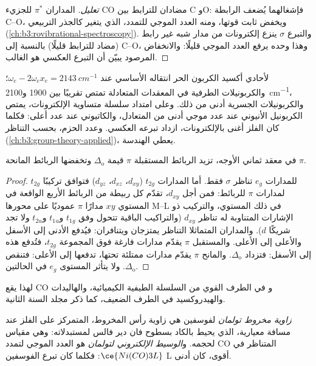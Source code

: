 \begin{proof}[تعليل]
المداران $\pi^*$ للجزيء CO مضادان للترابط بين C وO: فإشغالهما يُضعف
الرابطة C--O، ويخفض ثابت قوتها، ومنه العدد الموجي للتمدد، الذي
يتغير كالجذر التربيعي  (\cref{ch:b3:rovibrational-spectroscopy}).
والتبرع $\sigma$ ينزع إلكترونات من مدار شبه غير رابط (مضاد للترابط قليلًا)
بالنسبة إلى C--O، وهذا وحده يرفع العدد الموجي قليلًا: 
والانخفاض المرصود يبيّن أن التبرع العكسي هو الغالب.
\end{proof}

لأحادي أكسيد الكربون الحر انتقاله الأساسي عند $\omega_e - 2\omega_ex_e = \qty{2143}{cm^{-1}}$؛ 
والكربونيلات الطرفية في المعقدات المتعادلة تمتص تقريبًا بين 1900 و\qty{2100}{cm^{-1}}،
والكربونيلات الجسرية أدنى من ذلك. وعلى امتداد سلسلة متساوية الإلكترونات، يمتص الكربونيل
الأنيوني عند عدد موجي أدنى من المتعادل، والكاتيوني عند
عدد أعلى: فكلما كان الفلز أغنى بالإلكترونات، ازداد تبرعه العكسي. وعدد
الحزم، بحسب التناظر (\cref{ch:b3:group-theory-applied})، يعطي الهندسة.

\begin{proposition}\label{prop:b3:organometallic-bonding:pi-delta}
في معقد ثماني الأوجه، تزيد الربائط المستقبلة $\pi$ قيمة $\Delta_{\mathrm o}$ وتخفضها الربائط
المانحة $\pi$.
\end{proposition}

\begin{proof}
للمدارات $e_g$ تناظر $\sigma$ فقط. أما المدارات $t_{2g}$ ($d_{xy}$، $d_{xz}$، $d_{yz}$) فتوافق تركيبًا $t_{2g}$
لمدارات $\pi$ للربائط: فمن أجل $d_{xy}$، تقدّم كل ربيطة من الربائط الأربع الواقعة في المستوي $xy$
مدارًا $\pi$ عموديًا على محورها M--L في ذلك المستوي، 
والتركيب ذو الإشارات المتناوبة له تناظر $d_{xy}$ (والتراكيب
الباقية تتحول وفق $t_{1g}$ و$t_{1u}$ و$t_{2u}$ ولا تجد شريكًا $d$). والمداران
المتماثلا التناظر يمتزجان ويتنافران: فيُدفع الأدنى إلى الأسفل والأعلى إلى الأعلى. 
والمستقبل $\pi$ يقدّم مدارات فارغة فوق المجموعة $t_{2g}$، فتُدفع هذه إلى الأسفل: فتزداد $\Delta_{\mathrm o}$.
والمانح $\pi$ يقدّم مدارات ممتلئة تحتها، تدفعها إلى الأعلى: فتنقص $\Delta_{\mathrm o}$.
ولا يتأثر المستوى $e_g$ في الحالتين.
\end{proof}

لهذا يقع CO و في الطرف القوي من السلسلة الطيفية الكيميائية، 
والهاليدات والهيدروكسيد في الطرف الضعيف، كما ذكر مجلد السنة الثانية.

\begin{definition}\label{def:b3:organometallic-bonding:tolman}
\emph{زاوية مخروط تولمان} لفوسفين هي زاوية
رأس المخروط، المتمركز على الفلز عند مسافة معيارية، الذي يحيط بالكاد
بسطوح فان دير فالس لمستبدلاته: وهي مقياس لحجمه.
و\emph{الوسيط الإلكتروني لتولمان} هو
العدد الموجي لتمدد CO المتناظر في $\ce{Ni(CO)3L}$: فكلما كان تبرع
الفوسفين L أقوى، كان أدنى.
\end{definition}

